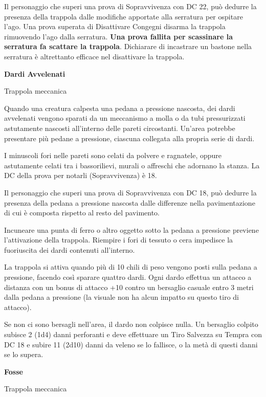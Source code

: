 \begin{multicols}{2}
Il personaggio che superi una prova di Sopravvivenza con DC 22, può dedurre la presenza della trappola dalle modifiche apportate alla serratura per ospitare l'ago. Una prova superata di Disattivare Congegni disarma la trappola rimuovendo l'ago dalla serratura. \textbf{Una prova fallita per scassinare la serratura fa scattare la trappola}. Dichiarare di incastrare un bastone nella serratura è altrettanto efficace nel disattivare la trappola.

\medskip

\textbf{Dardi Avvelenati}

Trappola meccanica

Quando una creatura calpesta una pedana a pressione nascosta, dei dardi avvelenati vengono sparati da un meccanismo a molla o da tubi pressurizzati astutamente nascosti all'interno delle pareti circostanti. Un'area potrebbe presentare più pedane a pressione, ciascuna collegata alla propria serie di dardi.

I minuscoli fori nelle pareti sono celati da polvere e ragnatele, oppure astutamente celati tra i bassorilievi, murali o affreschi che adornano la stanza. La DC della prova per notarli (Sopravvivenza) è 18.

Il personaggio che superi una prova di Sopravvivenza con DC 18, può dedurre la presenza della pedana a pressione nascosta dalle differenze nella pavimentazione di cui è composta rispetto al resto del pavimento.

Incuneare una punta di ferro o altro oggetto sotto la pedana a pressione previene l'attivazione della trappola. Riempire i fori di tessuto o cera impedisce la fuoriuscita dei dardi contenuti all'interno.

La trappola si attiva quando più di 10 chili di peso vengono posti sulla pedana a pressione, facendo così sparare quattro dardi. Ogni dardo effettua un attacco a distanza con un bonus di attacco +10 contro un bersaglio casuale entro 3 metri dalla pedana a pressione (la visuale non ha alcun impatto su questo tiro di attacco).

Se non ci sono bersagli nell'area, il dardo non colpisce nulla. Un bersaglio colpito subisce 2 (1d4) danni perforanti e deve effettuare un Tiro Salvezza su Tempra con DC 18 e subire 11 (2d10) danni da veleno se lo fallisce, o la metà di questi danni se lo supera.

\medskip

\textbf{Fosse}

Trappola meccanica


\end{multicols}
